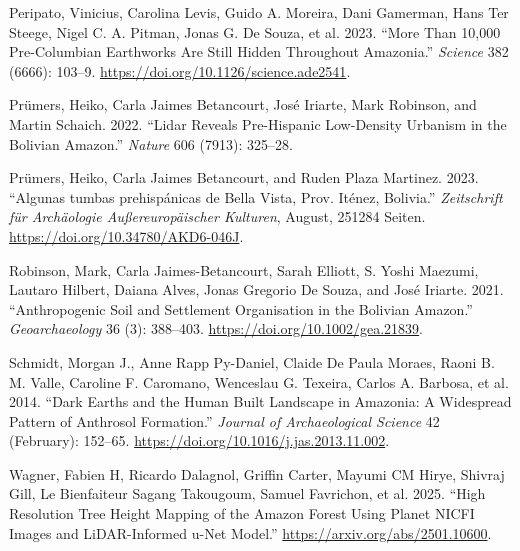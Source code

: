 \documentclass[
  letterpaper,
  DIV=11,
  numbers=noendperiod]{scrartcl}
\newlength{\cslhangindent}
\newenvironment{CSLReferences}[2] %
 {\begin{list}{}{%
  \setlength{\itemindent}{0pt}
  \setlength{\leftmargin}{0pt}
  \setlength{\parsep}{0pt}
  \ifodd #1
   \setlength{\leftmargin}{\cslhangindent}
   \setlength{\itemindent}{-1\cslhangindent}
  \fi
  \setlength{\itemsep}{#2\baselineskip}}}
 {\end{list}}
\begin{document}
\begin{CSLReferences}{1}{0}
Peripato, Vinicius, Carolina Levis, Guido A. Moreira, Dani Gamerman,
Hans Ter Steege, Nigel C. A. Pitman, Jonas G. De Souza, et al. 2023.
{``More Than 10,000 Pre-Columbian Earthworks Are Still Hidden Throughout
Amazonia.''} \emph{Science} 382 (6666): 103--9.
\url{https://doi.org/10.1126/science.ade2541}.

Prümers, Heiko, Carla Jaimes Betancourt, José Iriarte, Mark Robinson,
and Martin Schaich. 2022. {``Lidar Reveals Pre-Hispanic Low-Density
Urbanism in the Bolivian Amazon.''} \emph{Nature} 606 (7913): 325--28.

Prümers, Heiko, Carla Jaimes Betancourt, and Ruden Plaza Martinez. 2023.
{``Algunas tumbas prehispánicas de Bella Vista, Prov. Iténez,
Bolivia.''} \emph{Zeitschrift für Archäologie Außereuropäischer
Kulturen}, August, 251284 Seiten.
\url{https://doi.org/10.34780/AKD6-046J}.

Robinson, Mark, Carla Jaimes-Betancourt, Sarah Elliott, S. Yoshi
Maezumi, Lautaro Hilbert, Daiana Alves, Jonas Gregorio De Souza, and
José Iriarte. 2021. {``Anthropogenic Soil and Settlement Organisation in
the Bolivian Amazon.''} \emph{Geoarchaeology} 36 (3): 388--403.
\url{https://doi.org/10.1002/gea.21839}.

Schmidt, Morgan J., Anne Rapp Py-Daniel, Claide De Paula Moraes, Raoni
B. M. Valle, Caroline F. Caromano, Wenceslau G. Texeira, Carlos A.
Barbosa, et al. 2014. {``Dark Earths and the Human Built Landscape in
Amazonia: A Widespread Pattern of Anthrosol Formation.''} \emph{Journal
of Archaeological Science} 42 (February): 152--65.
\url{https://doi.org/10.1016/j.jas.2013.11.002}.

Wagner, Fabien H, Ricardo Dalagnol, Griffin Carter, Mayumi CM Hirye,
Shivraj Gill, Le Bienfaiteur Sagang Takougoum, Samuel Favrichon, et al.
2025. {``High Resolution Tree Height Mapping of the Amazon Forest Using
Planet NICFI Images and LiDAR-Informed u-Net Model.''}
\url{https://arxiv.org/abs/2501.10600}.

\end{CSLReferences}
\end{document}
